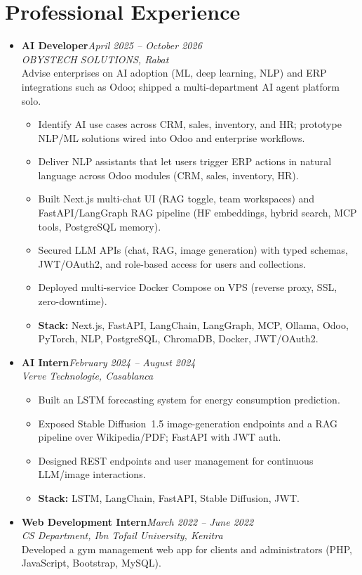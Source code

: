 \documentclass[10pt,a4paper]{article}
\newcommand{\role}[2]{\textbf{#1}\hfill\textit{\color{muted}#2}\\}
\newcommand{\org}[1]{\textit{#1}\\[0.5pt]}
\begin{document}
\section*{Professional Experience}
\begin{itemize}
    \item \role{AI Developer}{April 2025 -- October 2026}
          \org{OBYSTECH SOLUTIONS, Rabat}
          Advise enterprises on AI adoption (ML, deep learning, NLP) and ERP integrations such as Odoo; shipped a multi-department AI agent platform solo.
          \begin{itemize}
              \item Identify AI use cases across CRM, sales, inventory, and HR; prototype NLP/ML solutions wired into Odoo and enterprise workflows.
              \item Deliver NLP assistants that let users trigger ERP actions in natural language across Odoo modules (CRM, sales, inventory, HR).
              \item Built Next.js multi-chat UI (RAG toggle, team workspaces) and FastAPI/LangGraph RAG pipeline (HF embeddings, hybrid search, MCP tools, PostgreSQL memory).
              \item Secured LLM APIs (chat, RAG, image generation) with typed schemas, JWT/OAuth2, and role-based access for users and collections.
              \item Deployed multi-service Docker Compose on VPS (reverse proxy, SSL, zero-downtime).
              \item \textbf{Stack:} Next.js, FastAPI, LangChain, LangGraph, MCP, Ollama, Odoo, PyTorch, NLP, PostgreSQL, ChromaDB, Docker, JWT/OAuth2.
          \end{itemize}

    \item \role{AI Intern}{February 2024 -- August 2024}
          \org{Verve Technologie, Casablanca}
          \begin{itemize}
              \item Built an LSTM forecasting system for energy consumption prediction.
              \item Exposed Stable Diffusion~1.5 image-generation endpoints and a RAG pipeline over Wikipedia/PDF; FastAPI with JWT auth.
              \item Designed REST endpoints and user management for continuous LLM/image interactions.
              \item \textbf{Stack:} LSTM, LangChain, FastAPI, Stable Diffusion, JWT.
          \end{itemize}

    \item \role{Web Development Intern}{March 2022 -- June 2022}
          \org{CS Department, Ibn Tofail University, Kenitra}
          Developed a gym management web app for clients and administrators (PHP, JavaScript, Bootstrap, MySQL).
\end{itemize}
\end{document}
